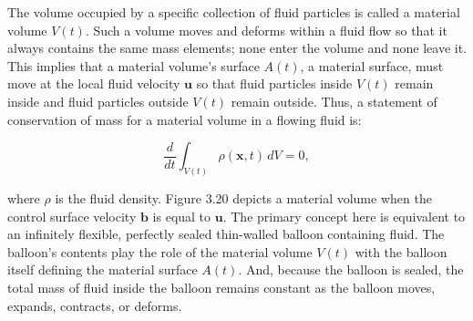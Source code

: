 \documentclass{article}
\begin{document}
The volume occupied by a specific collection of fluid particles is called a material volume \( V(t) \). Such a volume moves and deforms within a fluid flow so that it always contains the same mass elements; none enter the volume and none leave it. This implies that a material volume’s surface \( A(t) \), a material surface, must move at the local fluid velocity \( \mathbf{u} \) so that fluid particles inside \( V(t) \) remain inside and fluid particles outside \( V(t) \) remain outside. Thus, a statement of conservation of mass for a material volume in a flowing fluid is:

\begin{equation}
\frac{d}{dt} \int_{V(t)} \rho(\mathbf{x}, t) \, dV = 0,
\end{equation}

where \( \rho \) is the fluid density. Figure 3.20 depicts a material volume when the control surface velocity \( \mathbf{b} \) is equal to \( \mathbf{u} \). The primary concept here is equivalent to an infinitely flexible, perfectly sealed thin-walled balloon containing fluid. The balloon’s contents play the role of the material volume \( V(t) \) with the balloon itself defining the material surface \( A(t) \). And, because the balloon is sealed, the total mass of fluid inside the balloon remains constant as the balloon moves, expands, contracts, or deforms.
\end{document}
